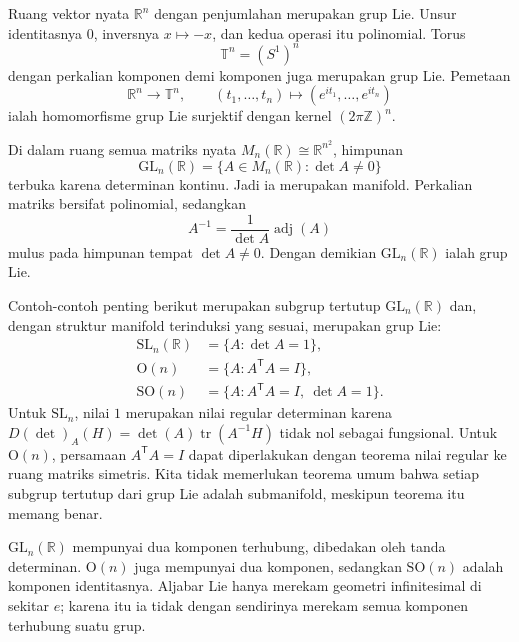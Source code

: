 \begin{beispiel}\label{o011-bl-ex-vector-groups}
Ruang vektor nyata $\mathbb R^n$ dengan penjumlahan merupakan grup Lie. Unsur
identitasnya $0$, inversnya $x\mapsto -x$, dan kedua operasi itu polinomial.
Torus
\[
  \mathbb T^n=(S^1)^n
\]
dengan perkalian komponen demi komponen juga merupakan grup Lie. Pemetaan
\[
  \mathbb R^n\longrightarrow\mathbb T^n,
  \qquad (t_1,\ldots,t_n)\longmapsto
  (e^{it_1},\ldots,e^{it_n})
\]
ialah homomorfisme grup Lie surjektif dengan kernel $(2\pi\mathbb Z)^n$.
\end{beispiel}

\begin{beispiel}\label{o011-bl-ex-general-linear}
Di dalam ruang semua matriks nyata $M_n(\mathbb R)\cong\mathbb R^{n^2}$,
himpunan
\[
  \mathrm{GL}_n(\mathbb R)=\{A\in M_n(\mathbb R):\det A\ne0\}
\]
terbuka karena determinan kontinu. Jadi ia merupakan manifold. Perkalian
matriks bersifat polinomial, sedangkan
\[
  A^{-1}=\frac{1}{\det A}\operatorname{adj}(A)
\]
mulus pada himpunan tempat $\det A\ne0$. Dengan demikian
$\mathrm{GL}_n(\mathbb R)$ ialah grup Lie.
\end{beispiel}

\begin{beispiel}\label{o011-bl-ex-matrix-subgroups}
Contoh-contoh penting berikut merupakan subgrup tertutup
$\mathrm{GL}_n(\mathbb R)$ dan, dengan struktur manifold terinduksi yang
sesuai, merupakan grup Lie:
\[
\begin{aligned}
 \mathrm{SL}_n(\mathbb R)&=\{A:\det A=1\},\\
 \mathrm O(n)&=\{A:A^{\mathsf T}A=I\},\\
 \mathrm{SO}(n)&=\{A:A^{\mathsf T}A=I,\ \det A=1\}.
\end{aligned}
\]
Untuk $\mathrm{SL}_n$, nilai $1$ merupakan nilai regular determinan karena
$D(\det)_A(H)=\det(A)\operatorname{tr}(A^{-1}H)$ tidak nol sebagai fungsional.
Untuk $\mathrm O(n)$, persamaan $A^{\mathsf T}A=I$ dapat diperlakukan dengan
teorema nilai regular ke ruang matriks simetris. Kita tidak memerlukan teorema
umum bahwa setiap subgrup tertutup dari grup Lie adalah submanifold, meskipun
teorema itu memang benar.
\end{beispiel}

\begin{bemerkung}\label{o011-bl-rem-components}
$\mathrm{GL}_n(\mathbb R)$ mempunyai dua komponen terhubung, dibedakan oleh
tanda determinan. $\mathrm O(n)$ juga mempunyai dua komponen, sedangkan
$\mathrm{SO}(n)$ adalah komponen identitasnya. Aljabar Lie hanya merekam
geometri infinitesimal di sekitar $e$; karena itu ia tidak dengan sendirinya
merekam semua komponen terhubung suatu grup.
\end{bemerkung}

